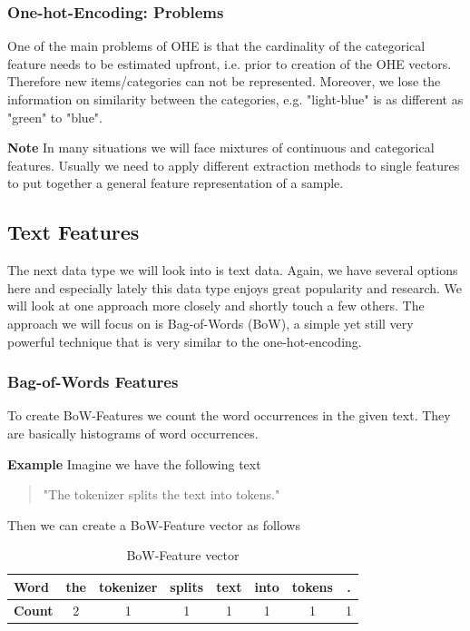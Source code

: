 \documentclass[a4paper]{article}
\begin{document}
\subsubsection{One-hot-Encoding: Problems}
One of the main problems of OHE is that the cardinality of the categorical feature needs to be estimated upfront, i.e. prior to creation of the OHE vectors.
Therefore new items/categories can not be represented. Moreover, we lose the information on similarity between the categories, e.g. "light-blue" is as different as "green" to "blue".

\textbf{Note} In many situations we will face mixtures of continuous and categorical features. Usually we need to apply different extraction methods
to single features to put together a general feature representation of a sample.
\subsection{Text Features}
The next data type we will look into is text data. Again, we have several options here and especially lately this data type enjoys great popularity and research.
We will look at one approach more closely and shortly touch a few others.
The approach we will focus on is Bag-of-Words (BoW), a simple yet still very powerful technique that is very similar to the one-hot-encoding.
\subsubsection{Bag-of-Words Features}
To create BoW-Features we count the word occurrences in the given text. They are basically histograms of word occurrences.

\textbf{Example} Imagine we have the following text
\begin{quote}
  "The tokenizer splits the text into tokens."
\end{quote}
Then we can create a BoW-Feature vector as follows

\begin{table}[h]
  \centering
  \begin{tabular}{|l|ccccccc|}
    \hline
    \textbf{Word} & the & tokenizer & splits & text & into & tokens & . \\
    \hline
    \textbf{Count} & 2 & 1 & 1 & 1 & 1 & 1 & 1 \\
    \hline
  \end{tabular}
  \caption{BoW-Feature vector}
  \label{tab:bow}
\end{table}
\end{document}
